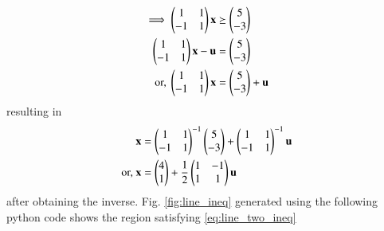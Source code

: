 \begin{enumerate}[label=\arabic*.,ref=\thesubsection.\theenumi]
\begin{align}
\implies 
\begin{pmatrix}1 & 1 \\ -1 & 1\end{pmatrix}\mathbf{x}  &\succeq \begin{pmatrix}5\\-3\end{pmatrix}
\\
\begin{pmatrix}1 & 1 \\ -1 & 1\end{pmatrix}\mathbf{x}  -\mathbf{u}&=\begin{pmatrix}5\\-3\end{pmatrix}
\\
\text{or, }
\begin{pmatrix}1 & 1 \\ -1 & 1\end{pmatrix}\mathbf{x} &= \begin{pmatrix}5\\-3\end{pmatrix} +\mathbf{u}
\end{align}
%
resulting in 
\begin{align}
\mathbf{x} &= \begin{pmatrix}1 & 1 \\ -1 & 1\end{pmatrix}^{-1}\begin{pmatrix}5\\-3\end{pmatrix} +\begin{pmatrix}1 & 1 \\ -1 & 1\end{pmatrix}^{-1}\mathbf{u}
\\
\text{or, } \mathbf{x} &= \begin{pmatrix}4\\1\end{pmatrix} +\frac{1}{2}\begin{pmatrix}1 & -1 \\ 1 & 1\end{pmatrix}\mathbf{u}
\end{align}
%
after obtaining the  inverse.
%
 Fig. \ref{fig:line_ineq} generated using the following python code shows the region satisfying \eqref{eq:line_two_ineq}


\end{enumerate}
